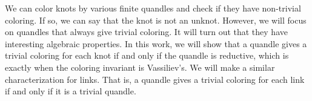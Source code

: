 \documentclass[12pt]{report}
\begin{document}

We can color knots by various finite quandles and check if they have non-trivial coloring. If so, we can
say that the knot is not an unknot. However, we will focus on quandles that always give trivial coloring.
It will turn out that they have interesting algebraic properties. In this work, we will show that a quandle
gives a trivial coloring for each knot if and only if the quandle is reductive, which is exactly when
the coloring invariant is Vassiliev's. We will make a similar characterization for links. That is,
a quandle gives a trivial coloring for each link if and only if it is a trivial quandle.
\end{document}
